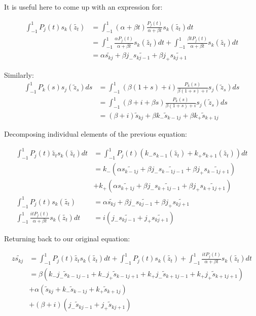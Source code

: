 \documentclass{article}
\begin{document}
It is useful here to come up with an expression for:

\begin{align}
    \int_{-1}^1P_j(t)s_k(\tilde{z_t}) &= \int_{-1}^1(\alpha+\beta t)\frac{P_j(t)}{\alpha + \beta t} s_k(\tilde{z_t})dt\\
    &= \int_{-1}^1\frac{\alpha P_j(t)}{\alpha+\beta t}s_k(\tilde{z_t})dt+\int_{-1}^1\frac{\beta tP_j(t)}{\alpha+\beta t}s_k(\tilde{z_t})dt\\
    &= \alpha\tilde{s_{kj}} + \beta j_-\tilde{s_{kj-1}}+\beta j_+\tilde{s_{kj+1}}
\end{align}

Similarly:
\begin{align}
    \int_{-1}^1P_k(s)s_j(\tilde{z}_s)ds &= \int_{-1}^1(\beta(1+s)+i)\frac{P_k(s)}{\beta(1+s)+i}s_j(\tilde{z}_s)ds\\
    &=\int_{-1}^1(\beta+i+\beta s)\frac{P_k(s)}{\beta(1+s)+i}s_j(\tilde{z}_s)ds\\
    &=(\beta+i)\tilde{s}_{kj}+\beta k_-\tilde{s}_{k-1j}+\beta k_+\tilde{s}_{k+1j}
\end{align}

Decomposing individual elements of the previous equation:

\begin{align}
	\int_{-1}^1P_j(t)\tilde{z_t}s_k(\tilde{z_t})dt&=\int_{-1}^1P_j(t)(k_-s_{k-1}(\tilde{z_t})+k_+s_{k+1}(\tilde{z_t}))dt\\
	&= k_-(\alpha\tilde{s_{k-1j}}+\beta j_-\tilde{s_{k-1j-1}}+\beta j_+\tilde{s_{k-1j+1}})\\
	&+ k_+(\alpha\tilde{s_{k+1j}}+\beta j_-\tilde{s_{k+1j-1}}+\beta j_+\tilde{s_{k+1j+1}})\\
	\int_{-1}^1P_j(t)s_k(\tilde{z_t}) &= \alpha\tilde{s_{kj}} + \beta j_-\tilde{s_{kj-1}}+\beta j_+\tilde{s_{kj+1}}\\
	\int_{-1}^1\frac{itP_j(t)}{\alpha+\beta t}s_k(\tilde{z_t})dt &= i(j_-\tilde{s_{kj-1}}+j_+\tilde{s_{kj+1}})
\end{align}

Returning back to our original equation:

\begin{align}
    z\tilde{s_{kj}}&=\int_{-1}^1P_j(t)\tilde{z_t}s_k(\tilde{z_t})dt
    +\int_{-1}^1P_j(t)s_k(\tilde{z_t})
    +\int_{-1}^1\frac{itP_j(t)}{\alpha+\beta t}s_k(\tilde{z_t})dt\\
    &=\beta(k_-j_-\tilde{s}_{k-1j-1}+k_-j_+\tilde{s}_{k-1j+1}+k_+j_-\tilde{s}_{k+1j-1}+k_+j_+\tilde{s}_{k+1j+1})\\
    &+\alpha(\tilde{s}_{kj}+k_-\tilde{s}_{k-1j}+k_+\tilde{s}_{k+1j})\\
    &+(\beta+i)(j_-\tilde{s}_{kj-1}+j_+\tilde{s}_{kj+1})
\end{align}
\end{document}
